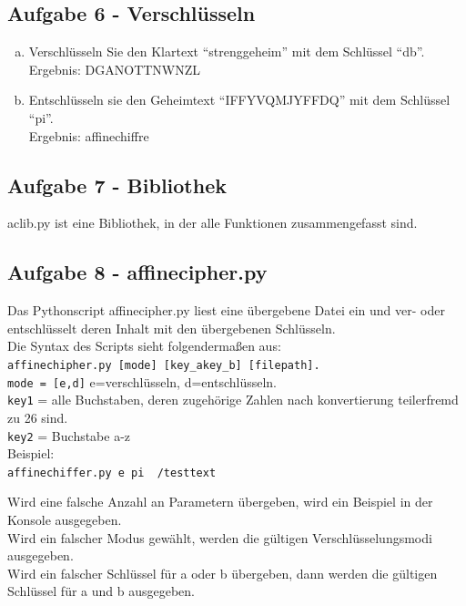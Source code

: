 \documentclass[12pt]{article}
\begin{document}
		\subsection{Aufgabe 6 - Verschl\"usseln}
		\begin{enumerate}[a)]
			\item Verschl\"usseln Sie den Klartext \enquote{strenggeheim} mit dem Schl\"ussel \enquote{db}.\\
Ergebnis: DGANOTTNWNZL

			\item Entschl\"usseln sie den Geheimtext \enquote{IFFYVQMJYFFDQ} mit dem Schl\"ussel \enquote{pi}.\\
Ergebnis: affinechiffre
		\end{enumerate}
 
		\subsection{Aufgabe 7 - Bibliothek}
			aclib.py ist eine Bibliothek, in der alle Funktionen zusammengefasst sind.
	
		\subsection{Aufgabe 8 - affinecipher.py}
			Das Pythonscript affinecipher.py liest eine \"ubergebene Datei ein und ver- oder entschl\"usselt deren Inhalt mit den \"ubergebenen Schl\"usseln.\\
Die Syntax des Scripts sieht folgenderma{\ss}en aus:\\
\texttt{affinechipher.py [mode] [key\_akey\_b] [filepath].}\\
\texttt{mode = [e,d]} e=verschl\"usseln, d=entschl\"usseln.\\
\texttt{key1} = alle Buchstaben, deren zugeh\"orige Zahlen nach konvertierung teilerfremd zu 26 sind.\\
\texttt{key2} = Buchstabe a-z\\[0.3cm]

Beispiel:\\
\texttt{affinechiffer.py e pi ~/testtext}

Wird eine falsche Anzahl an Parametern \"ubergeben, wird ein Beispiel in der Konsole ausgegeben.\\
Wird ein falscher Modus gew\"ahlt, werden die g\"ultigen Verschl\"usselungsmodi ausgegeben.\\
Wird ein falscher Schl\"ussel f\"ur a oder b \"ubergeben, dann werden die g\"ultigen Schl\"ussel f\"ur a und b ausgegeben.\\
			
\newpage
			
 
\end{document}
